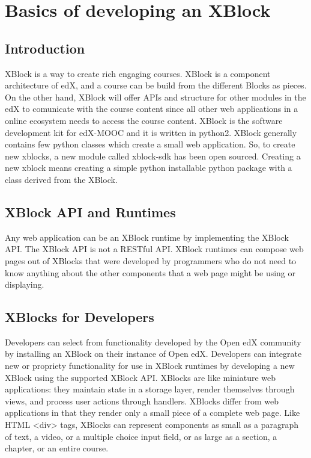 \chapter{Basics of developing an XBlock}
\section{Introduction}
XBlock is a way to create rich engaging courses. XBlock is a component architecture of edX, and a
course can be build from the different Blocks as pieces. On the other hand, XBlock will offer
APIs and structure for other modules in the edX to comunicate with the course content since all
other web applications in a online ecosystem needs to access the course content.\newline
XBlock is the software development kit for edX-MOOC and it is written in python2. XBlock
generally contains few python classes which create a small web application. So, to create new
xblocks, a new module called xblock-sdk has been open sourced. Creating a new xblock means
creating a simple python installable python package with a class derived from the XBlock.

\section{XBlock API and Runtimes}
Any web application can be an XBlock runtime by implementing the XBlock API. The
XBlock API is not a RESTful API. XBlock runtimes can compose web pages out of XBlocks that
were developed by programmers who do not need to know anything about the other components
that a web page might be using or displaying.

\section{XBlocks for Developers}
Developers can select from functionality developed by the Open edX community by installing an
XBlock on their instance of Open edX. Developers can integrate new or propriety functionality for
use in XBlock runtimes by developing a new XBlock using the supported XBlock API.\newline\newline
XBlocks are like miniature web applications: they maintain state in a storage layer, render
themselves through views, and process user actions through handlers. XBlocks differ from web
applications in that they render only a small piece of a complete web page. Like HTML <div> tags,
XBlocks can represent components as small as a paragraph of text, a video, or a multiple choice
input field, or as large as a section, a chapter, or an entire course.
